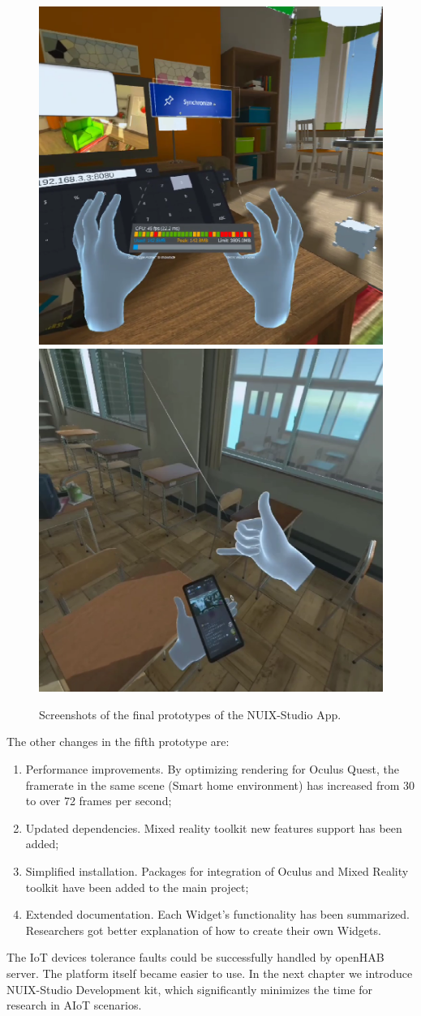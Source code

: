 \begin{figure}
  \centering
    {\includegraphics[width=0.45\linewidth]{figures/FinalPrototype.png}}
    {\includegraphics[width=0.45\linewidth]{figures/Prototype5.png}}
  \caption{Screenshots of the final prototypes of the NUIX-Studio App.}
  \label{fig:FinalPrototypes-figure}
\end{figure}

The other changes in the fifth prototype are:
\begin{enumerate}
    \item Performance improvements. By optimizing rendering for Oculus Quest, the framerate in the same scene (Smart home environment) has increased from 30 to over 72 frames per second;
    \item Updated dependencies. Mixed reality toolkit new features support has been added;
    \item Simplified installation. Packages for integration of Oculus and Mixed Reality toolkit have been added to the main project;
    \item Extended documentation. Each Widget's functionality has been summarized. Researchers got better explanation of how to create their own Widgets.
\end{enumerate}

The IoT devices tolerance faults could be successfully handled by openHAB server. The platform itself became easier to use. In the next chapter we introduce NUIX-Studio Development kit, which significantly minimizes the time for research in AIoT scenarios. 